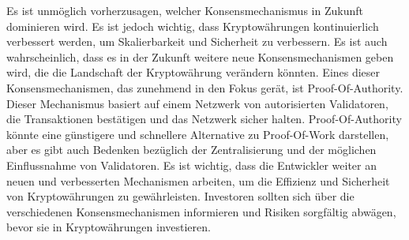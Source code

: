 \documentclass[ngerman]{scrreprt}
\begin{document}
Es ist unmöglich vorherzusagen, welcher Konsensmechanismus in Zukunft dominieren wird. Es ist jedoch wichtig, dass Kryptowährungen kontinuierlich verbessert werden, um Skalierbarkeit und Sicherheit zu verbessern. Es ist auch wahrscheinlich, dass es in der Zukunft weitere neue Konsensmechanismen geben wird, die die Landschaft der Kryptowährung verändern könnten. Eines dieser Konsensmechanismen, das zunehmend in den Fokus gerät, ist Proof-Of-Authority. Dieser Mechanismus basiert auf einem Netzwerk von autorisierten Validatoren, die Transaktionen bestätigen und das Netzwerk sicher halten. Proof-Of-Authority könnte eine günstigere und schnellere Alternative zu Proof-Of-Work darstellen, aber es gibt auch Bedenken bezüglich der Zentralisierung und der möglichen Einflussnahme von Validatoren. Es ist wichtig, dass die Entwickler weiter an neuen und verbesserten Mechanismen arbeiten, um die Effizienz und Sicherheit von Kryptowährungen zu gewährleisten. Investoren sollten sich über die verschiedenen Konsensmechanismen informieren und Risiken sorgfältig abwägen, bevor sie in Kryptowährungen investieren.

\printbibliography
\end{document}
